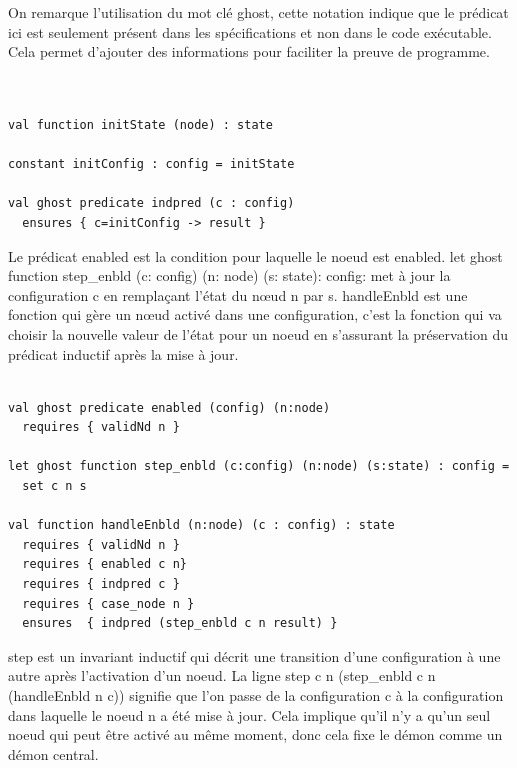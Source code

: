 \documentclass[11pt]{article}
\begin{document}
On remarque l'utilisation du mot clé ghost, cette notation indique que le prédicat ici est seulement présent dans 
les spécifications et non dans le code exécutable. Cela permet d'ajouter des informations pour faciliter la
preuve de programme.
\lstset{language=why3,label= ,caption= ,captionpos=b,numbers=none}
\begin{lstlisting}


val function initState (node) : state

constant initConfig : config = initState

val ghost predicate indpred (c : config)
  ensures { c=initConfig -> result }

\end{lstlisting}
Le prédicat enabled est la condition pour laquelle le noeud est enabled.
let ghost function step\_enbld (c: config) (n: node) (s: state): config: met à jour la configuration c en remplaçant l'état du nœud n par s.
handleEnbld est une fonction qui gère un nœud activé dans une configuration, c'est la fonction qui va choisir la nouvelle valeur de l'état pour un noeud
en s'assurant la préservation du prédicat inductif après la mise à jour. 
\lstset{language=why3,label= ,caption= ,captionpos=b,numbers=none}
\begin{lstlisting}

val ghost predicate enabled (config) (n:node)
  requires { validNd n }

let ghost function step_enbld (c:config) (n:node) (s:state) : config =
  set c n s

val function handleEnbld (n:node) (c : config) : state
  requires { validNd n }
  requires { enabled c n}
  requires { indpred c }
  requires { case_node n }
  ensures  { indpred (step_enbld c n result) }

\end{lstlisting}

step est un invariant inductif qui décrit une transition d'une configuration à une autre après l'activation d'un noeud.
La ligne step c n (step\_enbld c n (handleEnbld n c)) signifie que l'on passe de la configuration c à la configuration dans laquelle le noeud n a été mise à jour. 
Cela implique qu'il n'y a qu'un seul noeud qui peut être activé au même moment, donc cela fixe le démon comme un démon central. 
\end{document}

